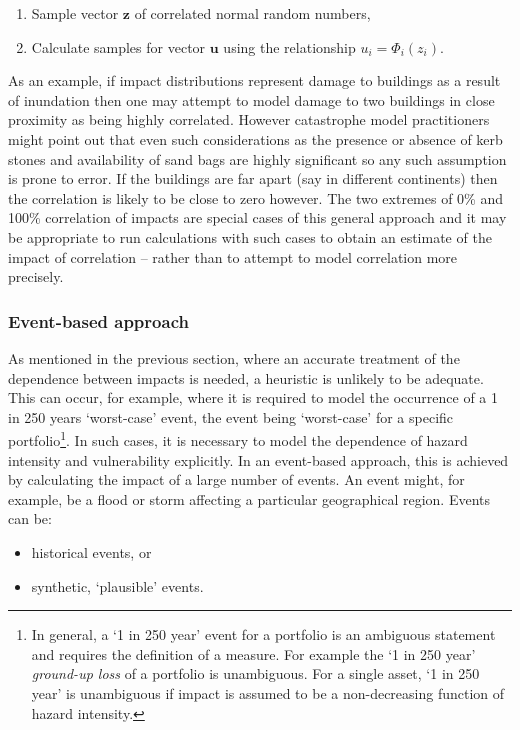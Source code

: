 \documentclass[a4paper,11pt]{extarticle} %
\begin{document}
\begin{enumerate}[]
    \item Sample vector $\mathbf{z}$ of correlated normal random numbers,
    \item Calculate samples for vector $\mathbf{u}$ using the relationship $u_i = \Phi_i(z_i)$.
\end{enumerate}

As an example, if impact distributions represent damage to buildings as a result of inundation then one may attempt to model damage to two buildings in close proximity as being highly correlated. However catastrophe model practitioners might point out that even such considerations as the presence or absence of kerb stones and availability of sand bags are highly significant so any such assumption is prone to error. If the buildings are far apart (say in different continents) then the correlation is likely to be close to zero however. The two extremes of 0\% and 100\% correlation of impacts are special cases of this general approach and it may be appropriate to run calculations with such cases to obtain an estimate of the impact of correlation -- rather than to attempt to model correlation more precisely.


\subsubsection{Event-based approach}
As mentioned in the previous section, where an accurate treatment of the dependence between impacts is needed, a heuristic is unlikely to be adequate. This can occur, for example, where it is required to model the occurrence of a 1 in 250 years `worst-case' event, the event being `worst-case' for a specific portfolio\footnote{In general, a `1 in 250 year' event for a portfolio is an ambiguous statement and requires the definition of a measure. For example the `1 in 250 year' \emph{ground-up loss} of a portfolio is unambiguous. For a single asset, `1 in 250 year' is unambiguous if impact is assumed to be a non-decreasing function of hazard intensity.}. In such cases, it is necessary to model the dependence of hazard intensity and vulnerability explicitly. In an event-based approach, this is achieved by calculating the impact of a large number of events. An event might, for example, be a flood or storm affecting a particular geographical region. Events can be:

\begin{itemize}
    \item historical events, or
    \item synthetic, `plausible' events.
\end{itemize}
\end{document}

